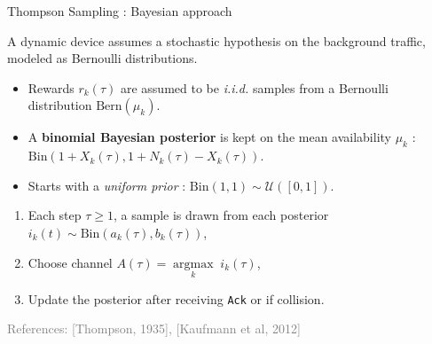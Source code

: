 \documentclass[12pt,english,ignorenonframetext,]{beamer}
\providecommand{\tightlist}{%
  \setlength{\itemsep}{0pt}\setlength{\parskip}{0pt}}
\begin{document}
\begin{frame}[noframenumbering]{Thompson Sampling : Bayesian approach}

A dynamic device assumes a stochastic hypothesis on the background
traffic, modeled as Bernoulli distributions.

\begin{itemize}
\item
  Rewards \(r_k(\tau)\) are assumed to be \emph{i.i.d.} samples from a
  Bernoulli distribution \(\mathrm{Bern}(\mu_k)\).
\item
  A \textbf{binomial Bayesian posterior} is kept on the mean
  availability \(\mu_k\) :
  \(\mathrm{Bin}(1 + X_k(\tau), 1 + N_k(\tau) - X_k(\tau))\).
\item
  Starts with a \emph{uniform prior} :
  \(\mathrm{Bin}(1, 1) \sim \mathcal{U}([0,1])\).
\end{itemize}

\begin{enumerate}
\def\labelenumi{\arabic{enumi}.}
\tightlist
\setlength{\itemindent}{1em}  %
\item
  Each step \(\tau \geq 1\), a sample is drawn from each posterior
  \(i_k(t) \sim \mathrm{Bin}(a_k(\tau), b_k(\tau))\),
\item
  Choose channel \(A(\tau) = \mathop{\arg\max}\limits_k \; i_k(\tau)\),
\item
  Update the posterior after receiving \texttt{Ack} or if collision.
\end{enumerate}

\vfill{}\hfill{}\tiny{\textcolor{gray}{References: [Thompson, 1935], [Kaufmann et al, 2012]}}

\end{frame}

\backupend
\end{document}
